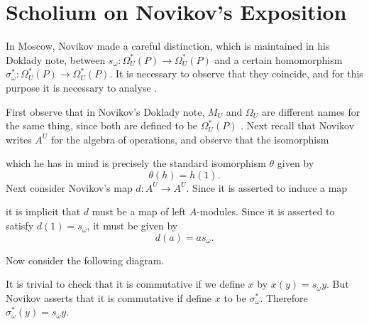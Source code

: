 \documentclass[../main]{subfiles}
\begin{document}
\label{sec:p1c7}


\chapter{Scholium on Novikov's Exposition}

In Moscow, Novikov made a careful distinction, which is maintained in his Doklady note, between $s_{\omega}\colon\Omega_U^{\ast}(P)\longrightarrow\Omega_U^{\ast}(P)$ and a certain homomorphism $\sigma_{\omega}^{\ast}\colon\Omega_U^{\ast}(P)\longrightarrow\Omega_U^{\ast}(P)$. It is necessary to observe that they coincide, and for this purpose it is necessary to analyse . %

First observe that in Novikov's Doklady note, $M_U$ and $\Omega_U$ are different names for the same thing, since both are defined to be $\Omega_U^{\ast}(P)$ . Next recall that Novikov writes $A^U$ for the algebra of operations, and observe that the isomorphism 
\begin{center}
\end{center}
which he has in mind is precisely the standard isomorphism $\theta$ given by
\begin{equation*}
    \theta(h)=h(1).
\end{equation*}
Next consider Novikov's map $d\colon A^U\longrightarrow A^U$. Since it is asserted to induce a map
\begin{center}
\end{center}
it is implicit that $d$ must be a map of left $A$-modules. Since it is asserted to satisfy $d(1)=s_{\omega}$, it must be given by
\begin{equation*}
    d(a)=as_{\omega}.
\end{equation*}

Now consider the following diagram.
\begin{center}
\end{center}

It is trivial to check that it is commutative if we define $x$ by $x(y)=s_{\omega}y$. But Novikov asserts that it is commutative if define $x$ to be $\sigma_{\omega}^{\ast}$. Therefore $\sigma_{\omega}^{\ast}(y)=s_{\omega}y$.
\end{document}

